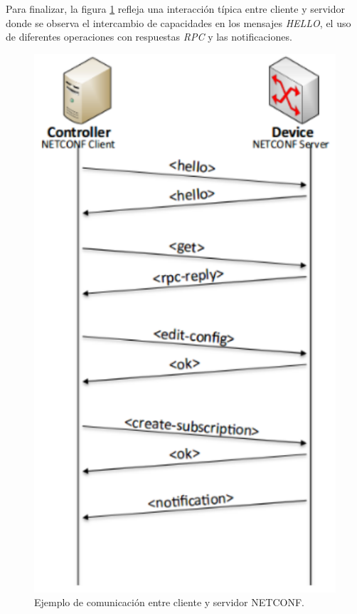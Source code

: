  Para finalizar, la figura \ref{fig:netconf_ejemplo} refleja una interacción típica entre cliente y servidor donde se observa el intercambio de capacidades en los mensajes \textit{HELLO}, el uso de diferentes operaciones con respuestas \textit{RPC} y las notificaciones.

  \begin{figure}[!h]
	\centering
	\includegraphics[scale=0.8]{Figures/netconf_ejemplo.pdf}
	\caption{Ejemplo de comunicación entre cliente y servidor NETCONF.}
	\label{fig:netconf_ejemplo}
  \end{figure}

